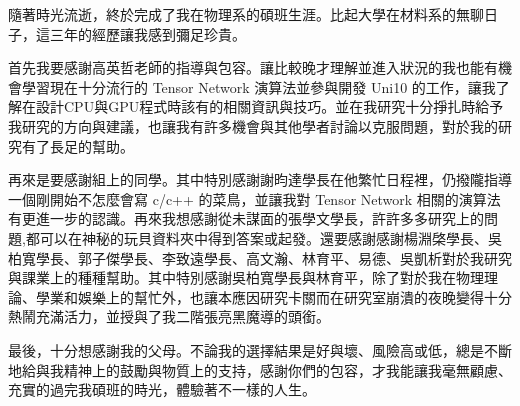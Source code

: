 \begin{acknowledgementszh}
隨著時光流逝，終於完成了我在物理系的碩班生涯。比起大學在材料系的無聊日子，這三年的經歷讓我感到彌足珍貴。

首先我要感謝高英哲老師的指導與包容。讓比較晚才理解並進入狀況的我也能有機會學習現在十分流行的 Tensor Network 演算法並參與開發 Uni10 的工作，讓我了解在設計CPU與GPU程式時該有的相關資訊與技巧。並在我研究十分掙扎時給予我研究的方向與建議，也讓我有許多機會與其他學者討論以克服問題，對於我的研究有了長足的幫助。

再來是要感謝組上的同學。其中特別感謝謝昀達學長在他繁忙日程裡，仍撥隴指導一個剛開始不怎麼會寫 c/c++ 的菜鳥，並讓我對 Tensor Network 相關的演算法有更進一步的認識。再來我想感謝從未謀面的張學文學長，許許多多研究上的問題,都可以在神秘的玩貝資料夾中得到答案或起發。還要感謝感謝楊淵棨學長、吳柏寬學長、郭子傑學長、李致遠學長、高文瀚、林育平、易德、吳凱析對於我研究與課業上的種種幫助。其中特別感謝吳柏寬學長與林育平，除了對於我在物理理論、學業和娛樂上的幫忙外，也讓本應因研究卡關而在研究室崩潰的夜晚變得十分熱鬧充滿活力，並授與了我二階張亮黑魔導的頭銜。

最後，十分想感謝我的父母。不論我的選擇結果是好與壞、風險高或低，總是不斷地給與我精神上的鼓勵與物質上的支持，感謝你們的包容，才我能讓我毫無顧慮、充實的過完我碩班的時光，體驗著不一樣的人生。
\end{acknowledgementszh}

